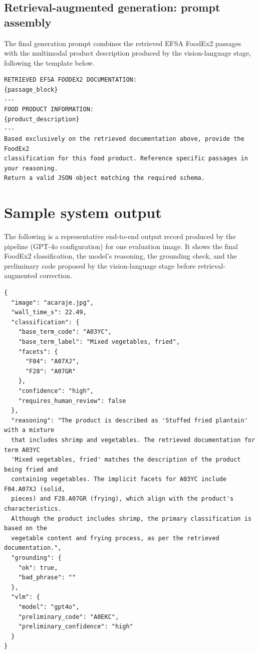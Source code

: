 \subsection{Retrieval-augmented generation: prompt assembly}

The final generation prompt combines the retrieved EFSA FoodEx2 passages with the
multimodal product description produced by the vision-language stage, following
the template below.

\begin{footnotesize}
\begin{verbatim}
RETRIEVED EFSA FOODEX2 DOCUMENTATION:
{passage_block}
---
FOOD PRODUCT INFORMATION:
{product_description}
---
Based exclusively on the retrieved documentation above, provide the FoodEx2
classification for this food product. Reference specific passages in your reasoning.
Return a valid JSON object matching the required schema.
\end{verbatim}
\end{footnotesize}

\section{Sample system output}\label{ap:sample}

The following is a representative end-to-end output record produced by the pipeline
(GPT-4o configuration) for one evaluation image. It shows the final FoodEx2
classification, the model's reasoning, the grounding check, and the preliminary
code proposed by the vision-language stage before retrieval-augmented correction.

\begin{footnotesize}
\begin{verbatim}
{
  "image": "acaraje.jpg",
  "wall_time_s": 22.49,
  "classification": {
    "base_term_code": "A03YC",
    "base_term_label": "Mixed vegetables, fried",
    "facets": {
      "F04": "A07XJ",
      "F28": "A07GR"
    },
    "confidence": "high",
    "requires_human_review": false
  },
  "reasoning": "The product is described as 'Stuffed fried plantain' with a mixture
  that includes shrimp and vegetables. The retrieved documentation for term A03YC
  'Mixed vegetables, fried' matches the description of the product being fried and
  containing vegetables. The implicit facets for A03YC include F04.A07XJ (solid,
  pieces) and F28.A07GR (frying), which align with the product's characteristics.
  Although the product includes shrimp, the primary classification is based on the
  vegetable content and frying process, as per the retrieved documentation.",
  "grounding": {
    "ok": true,
    "bad_phrase": ""
  },
  "vlm": {
    "model": "gpt4o",
    "preliminary_code": "A0EKC",
    "preliminary_confidence": "high"
  }
}
\end{verbatim}
\end{footnotesize}
